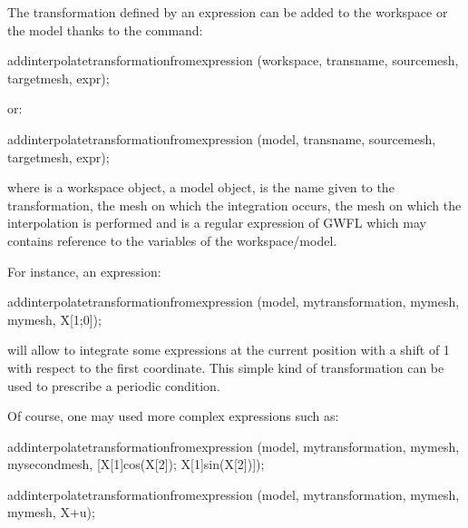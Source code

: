 \documentclass[a4paper,11pt,english]{sphinxmanual}
\begin{document}
The transformation defined by an expression can be added to the workspace or the model thanks to the command:

\begin{sphinxVerbatim}[commandchars=\\\{\}]
add\PYGZus{}interpolate\PYGZus{}transformation\PYGZus{}from\PYGZus{}expression
  (workspace, transname, source\PYGZus{}mesh, target\PYGZus{}mesh, expr);
\end{sphinxVerbatim}

or:

\begin{sphinxVerbatim}[commandchars=\\\{\}]
add\PYGZus{}interpolate\PYGZus{}transformation\PYGZus{}from\PYGZus{}expression
  (model, transname, source\PYGZus{}mesh, target\PYGZus{}mesh, expr);
\end{sphinxVerbatim}

where  is a workspace object,  a model object,  is the name given to the transformation,  the mesh on which the integration occurs,  the mesh on which the interpolation is performed and  is a regular expression of GWFL which may contains reference to the variables of the workspace/model.

For instance, an expression:

\begin{sphinxVerbatim}[commandchars=\\\{\}]
add\PYGZus{}interpolate\PYGZus{}transformation\PYGZus{}from\PYGZus{}expression
  (model, \PYGZdq{}my\PYGZus{}transformation\PYGZdq{}, my\PYGZus{}mesh, my\PYGZus{}mesh, \PYGZdq{}X\PYGZhy{}[1;0]\PYGZdq{});
\end{sphinxVerbatim}

will allow to integrate some expressions at the current position with a shift of \sphinxhyphen{}1 with respect to the first coordinate. This simple kind of transformation can be used to prescribe a periodic condition.

Of course, one may used more complex expressions such as:

\begin{sphinxVerbatim}[commandchars=\\\{\}]
add\PYGZus{}interpolate\PYGZus{}transformation\PYGZus{}from\PYGZus{}expression
  (model, \PYGZdq{}my\PYGZus{}transformation\PYGZdq{}, my\PYGZus{}mesh, my\PYGZus{}second\PYGZus{}mesh, \PYGZdq{}[X[1]cos(X[2]); X[1]sin(X[2])]\PYGZdq{});

add\PYGZus{}interpolate\PYGZus{}transformation\PYGZus{}from\PYGZus{}expression
  (model, \PYGZdq{}my\PYGZus{}transformation\PYGZdq{}, my\PYGZus{}mesh, my\PYGZus{}mesh, \PYGZdq{}X+u\PYGZdq{});
\end{sphinxVerbatim}
\end{document}
